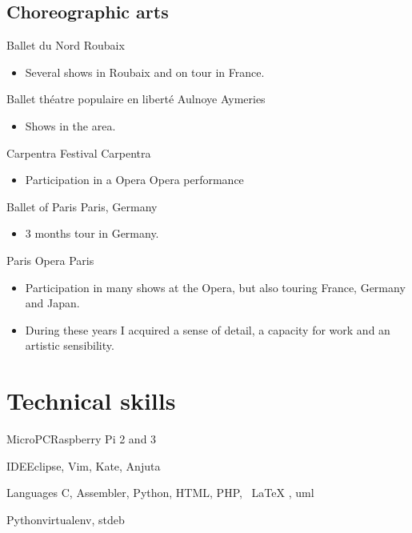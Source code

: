 \documentclass[11pt,a4paper,sans]{moderncv}   %
\begin{document}
\subsection{Choreographic arts}
 {Ballet du Nord} {Roubaix} {} {
\begin{itemize}
 \item Several shows in Roubaix and on tour in France.
\end{itemize}
}
 {Ballet théatre populaire en liberté} {Aulnoye Aymeries} {} {
\begin{itemize}
 \item Shows in the area.
\end{itemize}
}
 {Carpentra Festival} {Carpentra} {} {
\begin{itemize}
 \item Participation in a Opera Opera performance
\end{itemize}
}
 {Ballet of Paris} {Paris, Germany} {} {
\begin{itemize}
 \item 3 months tour in Germany.
\end{itemize}
}
 {Paris Opera} {Paris} {} {
\begin{itemize}
    \item Participation in many shows at the Opera, but also touring France, Germany and Japan.
    \item During these years I acquired a sense of detail, a capacity for work and an artistic sensibility.
\end{itemize}
}

\clearpage
\section{Technical skills}
{MicroPC}{Raspberry Pi 2 and 3}

{IDE}{Eclipse, Vim, Kate, Anjuta}

{Languages} {C, Assembler, Python, HTML, PHP, \ LaTeX {}, uml}

{Python}{virtualenv, stdeb}
\end{document}
